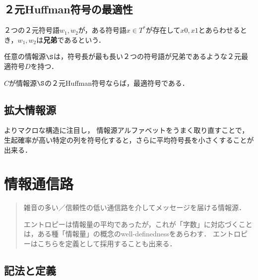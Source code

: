 \documentclass[uplatex,dvipdfmx]{jsreport}
\begin{document}
\section{２元Huffman符号の最適性}

\begin{definition}[sibling]
    ２つの２元符号語$w_1,w_2$が，ある符号語$x\in T^*$が存在して$x0,x1$とあらわせるとき，$w_1,w_2$は\textbf{兄弟}であるという．
\end{definition}

\begin{lemma}
    任意の情報源$\S$は，符号長が最も長い２つの符号語が兄弟であるような２元最適符号$D$を持つ．
\end{lemma}

\begin{theorem}
    $C$が情報源$\S$の２元Huffman符号ならば，最適符号である．
\end{theorem}

\section{拡大情報源}

\begin{tcolorbox}[colframe=ForestGreen, colback=ForestGreen!10!white,breakable,colbacktitle=ForestGreen!40!white,coltitle=black,fonttitle=\bfseries\sffamily,
title=]
    よりマクロな構造に注目し，
    情報源アルファベットをうまく取り直すことで，生起確率が高い特定の列を符号化すると，さらに平均符号長を小さくすることが出来る．
\end{tcolorbox}

\chapter{情報通信路}

\begin{quotation}
    雑音の多い／信頼性の低い通信路を介してメッセージを届ける情報源．

    エントロピーは情報量の平均であったが，これが「字数」に対応づくことは，ある種「情報量」の概念のwell-definednessをあらわす．
    エントロピーはこちらを定義として採用することも出来る．
\end{quotation}

\section{記法と定義}
\end{document}
